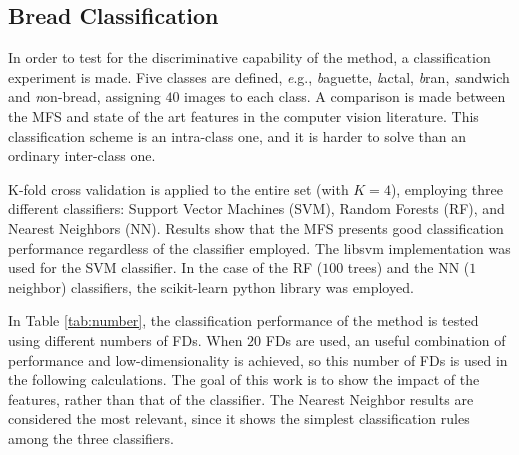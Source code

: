 



\subsection{Bread Classification}
\label{sec:10}

In order to test for the discriminative capability of the method, a classification experiment is made. Five classes are defined, {\emph e.g.}, {\emph baguette}, {\emph lactal}, {\emph bran}, {\emph sandwich} and {\emph non-bread}, assigning $40$ images to each class. A comparison is made between the MFS and state of the art features in the computer vision literature. This classification scheme is an intra-class one, and it is harder to solve than an ordinary inter-class one. 

K-fold cross validation is applied to the entire set (with $K=4$), employing three different classifiers: Support Vector Machines (SVM), Random Forests (RF), and Nearest Neighbors (NN). Results show that the MFS presents good classification performance regardless of the classifier employed. The libsvm implementation \cite{Chang2011} was used for the SVM classifier. In the case of the RF ($100$ trees) and the NN ($1$ neighbor) classifiers, the scikit-learn python library was employed.

In Table \ref{tab:number}, the classification performance of the method is tested using different numbers of FDs. When $20$ FDs are used, an useful combination of performance and low-dimensionality is achieved, so this number of FDs is used in the following calculations. The goal of this work is to show the impact of the features, rather than that of the classifier. The Nearest Neighbor results are considered the most relevant, since it shows the simplest classification rules among the three classifiers.

